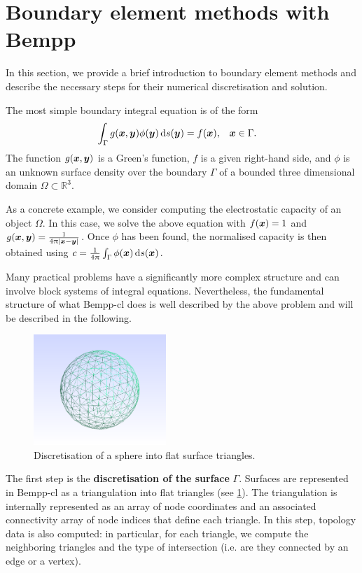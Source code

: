 \section{Boundary element methods with Bempp}
In this section, we provide a brief introduction to boundary element methods and describe the necessary steps for their numerical discretisation and solution.

The most simple boundary integral equation is of the form
\begin{align}
  \label{eq:bnd_integral}
  \int_{\Gamma} g(\bx, \by)\phi(\by)\,\mathrm{d}s(\by) &= f(\bx),&&\bx\in\Gamma.
\end{align}
The function $g(\boldsymbol{x}, \boldsymbol{y})$ is a Green's function, $f$ is a given right-hand side, and $\phi$ is an unknown surface density over the boundary $\Gamma$ of a bounded three dimensional domain $\Omega\subset\mathbb{R}^3$.

As a concrete example, we consider computing the electrostatic capacity of an object $\Omega$. In this case, we solve the above equation with $f(\boldsymbol{x})=1$ and $g(\boldsymbol{x},\boldsymbol{y})=\frac{1}{4\uppi|\boldsymbol{x} - \boldsymbol{y}|}$. Once $\phi$ has been found, the normalised capacity is then obtained using $c = \frac{1}{4\uppi}\int_{\Gamma}\phi(\boldsymbol{x})\,\mathrm{d}s(\boldsymbol{x})$.

Many practical problems have a significantly more complex structure and can involve block systems of integral equations. Nevertheless, the fundamental structure of what Bempp-cl does is well described by the above problem and will be described in the following.

\begin{figure}
  \center
  \includegraphics[width=5cm]{img/sphere}
  \caption{Discretisation of a sphere into flat surface triangles.}
  \label{fig:triangulation}
\end{figure}

The first step is the \textbf{discretisation of the surface} $\Gamma$. Surfaces are represented in Bempp-cl as a triangulation into flat triangles (see \cref{fig:triangulation}). The triangulation is internally represented as an array of node coordinates and an associated connectivity array of node indices that define each triangle. In this step, topology data is also computed: in particular, for each triangle, we compute the neighboring triangles and the type of intersection (i.e. are they connected by an edge or a vertex).

